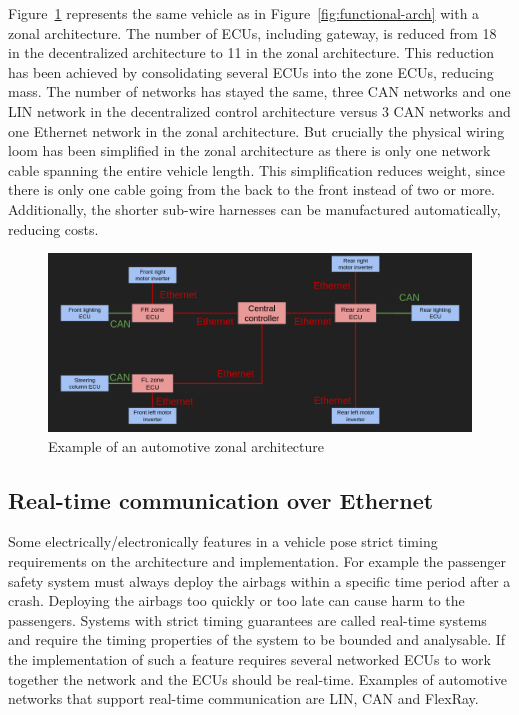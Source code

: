 Figure~\ref{fig:zonal-arch} represents the same vehicle as in Figure~\ref{fig:functional-arch} with a zonal architecture. The number of ECUs, including gateway, is reduced from 18 in the decentralized architecture to 11 in the zonal architecture. This reduction has been achieved by consolidating several ECUs into the zone ECUs, reducing mass. The number of networks has stayed the same, three CAN networks and one LIN network in the decentralized control architecture versus 3 CAN networks and one Ethernet network in the zonal architecture. But crucially the physical wiring loom has been simplified in the zonal architecture as there is only one network cable spanning the entire vehicle length. This simplification reduces weight, since there is only one cable going from the back to the front instead of two or more. Additionally, the shorter sub-wire harnesses can be manufactured automatically, reducing costs.

\begin{figure}[htb]
    \centering
    \includegraphics[width=\textwidth]{images/zone-arch.png}
    \caption{Example of an automotive zonal architecture}
    \label{fig:zonal-arch}
\end{figure}
\subsection{Real-time communication over Ethernet}
Some electrically/electronically features in a vehicle pose strict timing requirements on the architecture and implementation. For example the passenger safety system must always deploy the airbags within a specific time period after a crash. Deploying the airbags too quickly or too late can cause harm to the passengers. Systems with strict timing guarantees are called real-time systems and require the timing properties of the system to be bounded and analysable. If the implementation of such a feature requires several networked ECUs to work together the network and the ECUs should be real-time. Examples of automotive networks that support real-time communication are LIN, CAN and FlexRay. 

